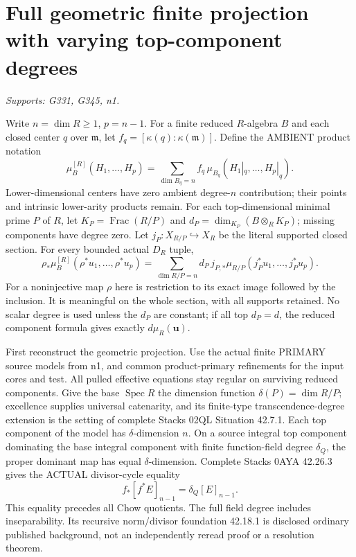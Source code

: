 \documentclass[11pt]{article}
\begin{document}
\section{Full geometric finite projection with varying top-component degrees}
\textit{Supports: G331, G345, n1.}

Write $n=\dim R\ge1$, $p=n-1$. For a finite reduced $R$-algebra $B$ and each closed center $q$ over $\mathfrak m$, let $f_q=[\kappa(q):\kappa(\mathfrak m)]$. Define the AMBIENT product notation
\[
\mu_B^{[R]}(H_1,\ldots,H_p)=
\sum_{\dim B_q=n} f_q\,\mu_{B_q}(H_1|_q,\ldots,H_p|_q).
\]
Lower-dimensional centers have zero ambient degree-$n$ contribution; their points and intrinsic lower-arity products remain. For each top-dimensional minimal prime $P$ of $R$, let $K_P=\operatorname{Frac}(R/P)$ and
$d_P=\dim_{K_P}(B\otimes_R K_P)$; missing components have degree zero. Let $j_P:X_{R/P}\hookrightarrow X_R$ be the literal supported closed section. For every bounded actual $D_R$ tuple,
\[
\rho_*\mu_B^{[R]}(\rho^*u_1,\ldots,\rho^*u_p)
=\sum_{\dim R/P=n}d_P\,j_{P,*}\mu_{R/P}(j_P^*u_1,\ldots,j_P^*u_p). \tag{18}
\]
For a noninjective map $\rho$ here is restriction to its exact image followed by the inclusion. It is meaningful on the whole section, with all supports retained. No scalar degree is used unless the $d_P$ are constant; if all top $d_P=d$, the reduced component formula gives exactly $d\mu_R(\boldsymbol u)$.

First reconstruct the geometric projection. Use the actual finite PRIMARY source models from n1, and common product-primary refinements for the input cores and test. All pulled effective equations stay regular on surviving reduced components. Give the base $\operatorname{Spec}R$ the dimension function $\delta(P)=\dim R/P$; excellence supplies universal catenarity, and its finite-type transcendence-degree extension is the setting of complete Stacks 02QL Situation 42.7.1. Each top component of the model has $\delta$-dimension $n$. On a source integral top component dominating the base integral component with finite function-field degree $\delta_Q$, the proper dominant map has equal $\delta$-dimension. Complete Stacks 0AYA 42.26.3 gives the ACTUAL divisor-cycle equality
\[
f_*[f^*E]_{n-1}=\delta_Q[E]_{n-1}.                   \tag{19}
\]
This equality precedes all Chow quotients. The full field degree includes inseparability. Its recursive norm/divisor foundation 42.18.1 is disclosed ordinary published background, not an independently reread proof or a resolution theorem.
\end{document}
